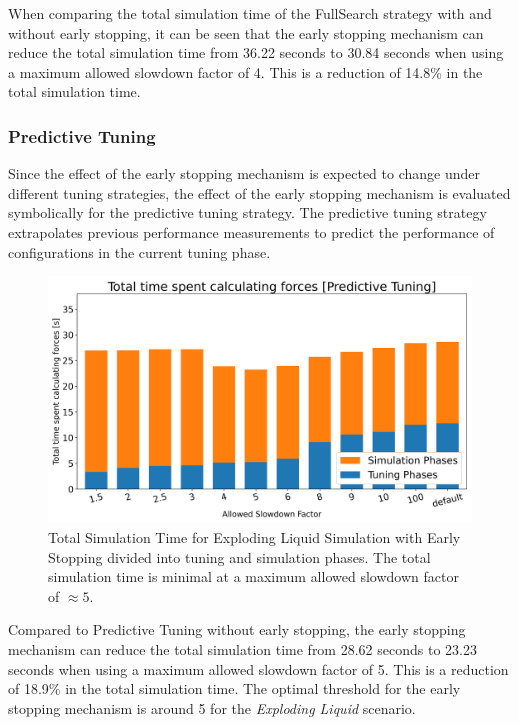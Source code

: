 \documentclass[conference]{IEEEtran}
\begin{document}
When comparing the total simulation time of the FullSearch strategy with and without early stopping, it can be seen that the early stopping mechanism can reduce the total simulation time from 36.22 seconds to 30.84 seconds when using a maximum allowed slowdown factor of 4. This is a reduction of 14.8\% in the total simulation time.

\subsubsection{Predictive Tuning}

Since the effect of the early stopping mechanism is expected to change under different tuning strategies, the effect of the early stopping mechanism is evaluated symbolically for the predictive tuning strategy. The predictive tuning strategy extrapolates previous performance measurements to predict the performance of configurations in the current tuning phase.

\begin{figure}[H]
    \centering

    \includegraphics[width=\columnwidth]{../data/explodingLiquid/cluster/predictiveTuning/analytics/total_time_average.png}

    \caption{Total Simulation Time for Exploding Liquid Simulation with Early Stopping divided into tuning and simulation phases. The total simulation time is minimal at a maximum allowed slowdown factor of $\approx5$.}
\end{figure}

Compared to Predictive Tuning without early stopping, the early stopping mechanism can reduce the total simulation time from 28.62 seconds to 23.23 seconds when using a maximum allowed slowdown factor of 5. This is a reduction of 18.9\% in the total simulation time. The optimal threshold for the early stopping mechanism is around 5 for the \textit{Exploding Liquid} scenario.
\end{document}
